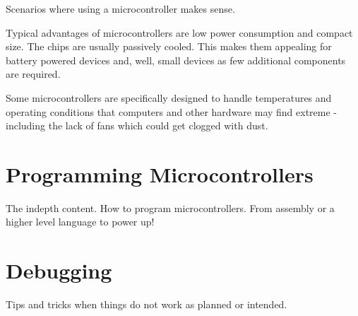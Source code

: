 \documentclass[a4paper,11pt]{article}
\begin{document}
Scenarios where using a microcontroller makes sense.

Typical advantages of microcontrollers are low power consumption and compact
size. The chips are usually passively cooled. This makes them appealing for
battery powered devices and, well, small devices as few additional components
are required.

Some microcontrollers are specifically designed to handle temperatures and
operating conditions that computers and other hardware may find extreme -
including the lack of fans which could get clogged with dust.

\section{Programming Microcontrollers}

The indepth content. How to program microcontrollers. From assembly or a higher
level language to power up!

\section{Debugging}

Tips and tricks when things do not work as planned or intended.
\end{document}
